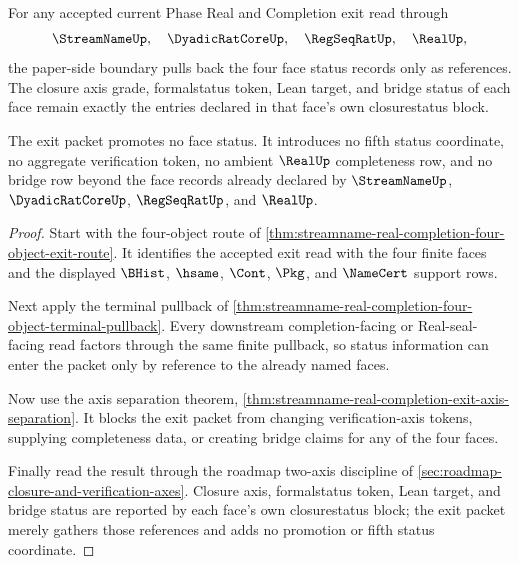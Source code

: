 \begin{theorem}
\label{thm:streamname-real-completion-face-status-pullback}
For any accepted current Phase Real and Completion exit read through
$$
\StreamNameUp,\quad \DyadicRatCoreUp,\quad \RegSeqRatUp,\quad \RealUp,
$$
the paper-side boundary pulls back the four face status records only as references. The closure axis grade, formalstatus token, Lean target, and bridge status of each face remain exactly the entries declared in that face's own closurestatus block.

The exit packet promotes no face status. It introduces no fifth status coordinate, no aggregate verification token, no ambient $\RealUp$ completeness row, and no bridge row beyond the face records already declared by $\StreamNameUp$, $\DyadicRatCoreUp$, $\RegSeqRatUp$, and $\RealUp$.
\end{theorem}
\begin{proof}
Start with the four-object route of \autoref{thm:streamname-real-completion-four-object-exit-route}. It identifies the accepted exit read with the four finite faces and the displayed $\BHist$, $\hsame$, $\Cont$, $\Pkg$, and $\NameCert$ support rows.

Next apply the terminal pullback of \autoref{thm:streamname-real-completion-four-object-terminal-pullback}. Every downstream completion-facing or Real-seal-facing read factors through the same finite pullback, so status information can enter the packet only by reference to the already named faces.

Now use the axis separation theorem, \autoref{thm:streamname-real-completion-exit-axis-separation}. It blocks the exit packet from changing verification-axis tokens, supplying completeness data, or creating bridge claims for any of the four faces.

Finally read the result through the roadmap two-axis discipline of \autoref{sec:roadmap-closure-and-verification-axes}. Closure axis, formalstatus token, Lean target, and bridge status are reported by each face's own closurestatus block; the exit packet merely gathers those references and adds no promotion or fifth status coordinate.
\end{proof}

